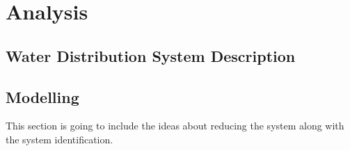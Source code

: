 
\part{Analysis}
\label{Analysis}

\chapter{Water Distribution System Description}
\label{water_distribution_system_description}

 





\chapter{Modelling}
\label{modelling}

This section is going to include the ideas about reducing the system along with the system identification. 





























